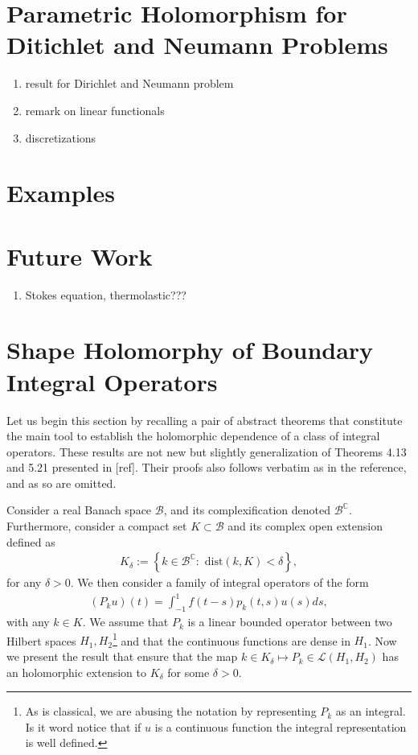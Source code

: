 \documentclass{article}
\newcommand{\todo}[1]{{\color{red}[#1]}}
\newcommand{\IC}{{\mathbb C}}
\begin{document}
\section{Parametric Holomorphism for Ditichlet and Neumann Problems}
\begin{enumerate}
\item 
result for Dirichlet and Neumann problem 
\item 
remark on linear functionals
\item 
discretizations
\end{enumerate}

\section{Examples}

\section{Future Work}
\begin{enumerate}
\item 
Stokes equation, thermolastic???
\end{enumerate}

\section{Shape Holomorphy of Boundary Integral Operators}

Let us begin this section by recalling a pair of abstract theorems that constitute the main tool to establish the holomorphic dependence of a class of integral operators. These results are not new but slightly generalization of  Theorems 4.13 and 5.21 presented in \todo{ref}. Their proofs also follows verbatim as in the reference, and as so are omitted.

Consider a real Banach space $\mathcal{B}$, and its complexification denoted $\mathcal{B}^{\IC}$. Furthermore, consider a compact set $K \subset \mathcal{B}$ and its complex open extension defined as 
\begin{align}
\label{eq:openext}
K_\delta :=  \left\lbrace k \in \mathcal{B}^{\IC} : \text{ dist}(k, K) < \delta \right\rbrace,
\end{align}
for any $\delta>0$. We then consider a family of integral operators of the form
\begin{align*}
(P_k u)(t) = \int_{-1}^{1} f(t-s) p_k(t,s) u(s) ds,
\end{align*}
with any $k \in K$. We assume that $P_k$ is a linear bounded operator between two Hilbert spaces $H_1,H_2$\footnote{As is classical, we are abusing the notation by representing $P_k$ as an integral. Is it word notice that if $u$ is a continuous function the integral representation is well defined.} and that the continuous functions are dense in $H_1$. Now we present the result that ensure that the map $k \in K_\delta \mapsto P_k \in \mathcal{L}(H_1,H_2)$ has an holomorphic extension to $K_\delta$ for some $\delta>0$. 
\end{document}
